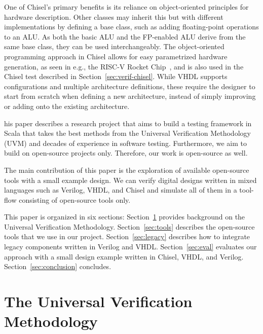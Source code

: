 \documentclass[conference]{IEEEtran}
\newcommand{\todo}[1]{{\color{olive} TODO: #1}}
\newcommand{\kasper}[1]{{\color{purple} Kasper: #1}}
\renewcommand{\todo}[1]{}
\renewcommand{\kasper}[1]{}
\begin{document}
One of Chisel's primary benefits is its reliance on object-oriented principles for hardware description.
Other classes may inherit this but with different implementations by defining a base class, such as adding floating-point operations to an ALU.
As both the basic ALU and the FP-enabled ALU derive from the same base class, they can be used interchangeably. The object-oriented programming approach in Chisel allows for easy parametrized hardware generation,
as seen in e.g., the RISC-V Rocket Chip~\cite{Asanovic2016}, and is also used in the Chisel test described in Section~\ref{sec:verif-chisel}. While VHDL supports configurations and multiple architecture definitions, these require the designer to start from scratch when defining a new architecture, instead of simply improving or adding onto the existing architecture. \kasper{Do we need more than this? Does Verilog have a similar concept?}

his paper describes a research project that aims to build a testing framework in Scala
that takes the best methods from the Universal Verification Methodology (UVM) and
decades of experience in software testing.
Furthermore, we aim to build on open-source projects only. Therefore, our
work is open-source as well.

The main contribution of this paper is the exploration of available open-source tools
with a small example design. We can verify digital designs written in mixed
languages such as Verilog, VHDL, and Chisel and simulate all of them in a tool-flow
consisting of open-source tools only.

This paper is organized in six sections: %
Section~\ref{sec:related} provides background on the Universal Verification Methodology.
Section~\ref{sec:tools} describes the open-source tools that we use in our project.
Section~\ref{sec:legacy} describes how to integrate legacy components written in Verilog and VHDL.
Section~\ref{sec:eval} evaluates our approach with a small design example written in Chisel, VHDL,
and Verilog.
Section~\ref{sec:conclusion} concludes.




\section{The Universal Verification Methodology}
\label{sec:related}


\todo{Related to our work}

\todo{reference for UVM}
\end{document}
